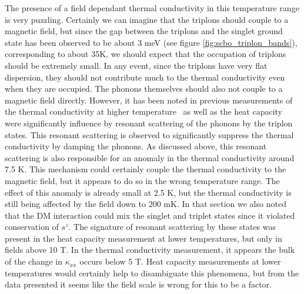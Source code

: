 \documentclass{thesis-umich}
\begin{document}
The presence of a field dependant thermal conductivity in this temperature range is very puzzling. Certainly we can imagine that the triplons should couple to a magnetic field, but since the gap between the triplons and the singlet ground state has been observed to be about 3 meV (see figure \ref{fig:scbo_triplon_bands}), corresponding to about 35K, we should expect that the occupation of triplons should be extremely small. In any event, since the triplons have very flat dispersion, they should not contribute much to the thermal conductivity even when they are occupied. The phonons themselves should also not couple to a magnetic field directly. However, it has been noted in previous measurements of the thermal conductivity at higher temperature~\cite{Hofmann2001} as well as the heat capacity~\cite{Jorge2005} were significantly influence by resonant scattering of the phonons by the triplon states. This resonant scattering is observed to significantly suppress the thermal conductivity by damping the phonons. As discussed above, this resonant scattering is also responsible for an anomaly in the thermal conductivity around 7.5 K. This mechanism could certainly couple the thermal conductivity to the magnetic field, but it appears to do so in the wrong temperature range. The effect of this anomaly is already small at 2.5 K, but the thermal conductivity is still being affected by the field down to 200 mK. In that section we also noted that the DM interaction could mix the singlet and triplet states since it violated conservation of $s^z$. The signature of resonant scattering by these states was present in the heat capacity measurement at lower temperatures, but only in fields above 10 T. In the thermal conductivity measurement, it appears the bulk of the change in $\kappa_{xx}$ occurs below 5 T. Heat capacity measurements at lower temperatures would certainly help to disambiguate this phenomena, but from the data presented it seems like the field scale is wrong for this to be a factor.
\end{document}
